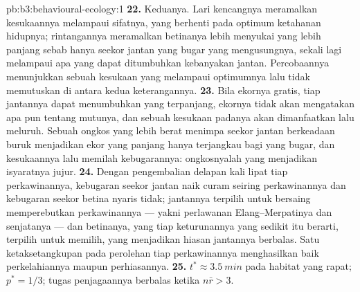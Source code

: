 \begin{solution}{pb:b3:behavioural-ecology:1}
\textbf{22.} Keduanya. Lari kencangnya meramalkan kesukaannya melampaui sifatnya,
yang berhenti pada optimum ketahanan hidupnya; rintangannya meramalkan betinanya lebih menyukai
yang lebih panjang sebab hanya seekor jantan yang bugar yang mengusungnya, sekali lagi melampaui apa yang dapat
ditumbuhkan kebanyakan jantan. Percobaannya menunjukkan sebuah kesukaan yang melampaui optimumnya lalu tidak
memutuskan di antara kedua keterangannya.
\textbf{23.} Bila ekornya gratis, tiap jantannya dapat menumbuhkan yang terpanjang,
ekornya tidak akan mengatakan apa pun tentang mutunya, dan sebuah kesukaan padanya
akan dimanfaatkan lalu meluruh. Sebuah ongkos yang lebih berat menimpa seekor jantan
berkeadaan buruk menjadikan ekor yang panjang hanya terjangkau bagi yang bugar,
dan kesukaannya lalu memilah kebugarannya: ongkosnyalah yang menjadikan
isyaratnya jujur.
\textbf{24.} Dengan pengembalian delapan kali lipat tiap perkawinannya, kebugaran seekor jantan
naik curam seiring perkawinannya dan kebugaran seekor betina nyaris tidak; jantannya
terpilih untuk bersaing memperebutkan perkawinannya --- yakni perlawanan Elang--Merpatinya dan
senjatanya --- dan betinanya, yang tiap keturunannya yang sedikit itu berarti, terpilih
untuk memilih, yang menjadikan hiasan jantannya berbalas. Satu ketaksetangkupan pada perolehan
tiap perkawinannya menghasilkan baik perkelahiannya maupun perhiasannya.
\textbf{25.} $t^{*} \approx \qty{3.5}{min}$ pada habitat yang rapat; $p^{*}
= 1/3$; tugas penjagaannya berbalas ketika $n\bar r > 3$.
\end{solution}
